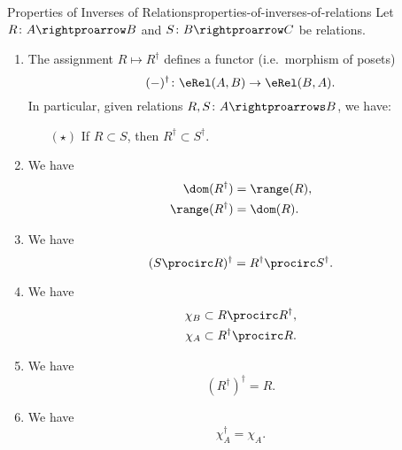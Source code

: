 \begin{proposition}{Properties of Inverses of Relations}{properties-of-inverses-of-relations}%
    Let $R\colon A\rightproarrow B$ and $S\colon B\rightproarrow C$ be relations.
    \begin{enumerate}
        \item\label{properties-of-inverses-of-relations-functoriality}The assignment $R\mapsto R^{\dagger}$ defines a functor (i.e.\ morphism of posets)
            \[
                (-)^{\dagger}%
                \colon%
                \eRel(A,B)%
                \to%
                \eRel(B,A).%
            \]%
            In particular, given relations $R,S\colon A\rightproarrows B$, we have:
            \begin{itemize}%
                \item[$(\star)$]If $R\subset S$, then $R^{\dagger}\subset S^{\dagger}$.
            \end{itemize}%
        \item\label{properties-of-inverses-of-relations-interaction-with-ranges-and-domains}We have
            \begin{align*}
                \dom(R^{\dagger})   &= \range(R),\\
                \range(R^{\dagger}) &= \dom(R).
            \end{align*}
        \item\label{properties-of-inverses-of-relations-interaction-with-composition-1}We have
            \[
                (S\procirc R)^{\dagger}
                =
                R^{\dagger}\procirc S^{\dagger}.
            \]%
        \item\label{properties-of-inverses-of-relations-interaction-with-composition-2}We have
            \begin{align*}
                \chi_{B} &\subset R\procirc R^{\dagger},\\
                \chi_{A} &\subset R^{\dagger}\procirc R.
            \end{align*}
        \item\label{properties-of-inverses-of-relations-invertibility}We have
            \[
                (R^{\dagger})^{\dagger}
                =
                R.
            \]%
        \item\label{properties-of-inverses-of-relations-identity}We have
            \[
                \chi^{\dagger}_{A}
                =
                \chi_{A}.
            \]%
    \end{enumerate}
\end{proposition}
